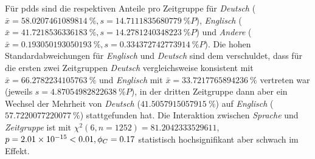 Für \glspl{pdd} sind die respektiven Anteile pro Zeitgruppe für \textit{Deutsch} ($\bar{x}=\SI[round-mode=places,round-precision=2]{58.0207461089814}{\percent},s=\SI[round-mode=places,round-precision=2]{14.7111835680779}{\percent P}$), \textit{Englisch} ($\bar{x}=\SI[round-mode=places,round-precision=2]{41.7218536336183}{\percent},s=\SI[round-mode=places,round-precision=2]{14.2781240348223}{\percent P}$) und \textit{Andere} ($\bar{x}=\SI[round-mode=places,round-precision=2]{0.193050193050193}{\percent},s=\SI[round-mode=places,round-precision=2]{0.334372742773914}{\percent P}$).
Die hohen Standardabweichungen für \textit{Englisch} und \textit{Deutsch} sind dem verschuldet, dass für die ersten zwei Zeitgruppen \textit{Deutsch} vergleichsweise konsistent mit $\bar{x}=\SI[round-mode=places,round-precision=2]{66.2782234105763}{\percent}$ und \textit{Englisch} mit $\bar{x}=\SI[round-mode=places,round-precision=2]{33.7217765894236}{\percent}$  vertreten war (jeweils $s=\SI[round-mode=places,round-precision=2]{4.87054982822638}{\percent P}$), in der dritten Zeitgruppe dann aber ein Wechsel der Mehrheit von \textit{Deutsch} ($\SI[round-mode=places,round-precision=2]{41.5057915057915}{\percent}$) auf \textit{Englisch} ($\SI[round-mode=places,round-precision=2]{57.7220077220077}{\percent}$) stattgefunden hat.
Die Interaktion zwischen \textit{Sprache} und \textit{Zeitgruppe} ist mit $\chi^2 (\num{6}, n=\num{1252}) = \num[round-mode=places,round-precision=2]{81.2042333529611}$, $p = \num[round-mode=places,round-precision=2]{2.01454276715493E-15}<\num{0.01},\phi_C=\num[round-mode=places,round-precision=2]{0.16785811702362}$ statistisch hochsignifikant aber schwach im Effekt.

